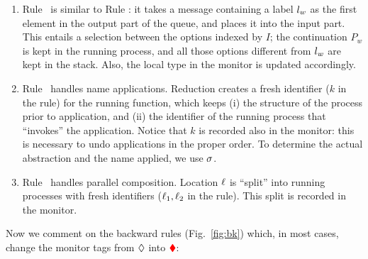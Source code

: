\documentclass[runningheads]{llncs}
\newcommand{\todo}[1]{\textcolor{red}{TO DO:#1}}
\newcommand{\erase}[1]{#1}
\begin{document}
\begin{enumerate}[$\fwcolor{\blacktriangleright}$]
\item 
\erase{Rule~ is similar to Rule \fwcolor{\textsc{(Sel)}}: it takes a message containing a label $l_w$ as the first element in the output part of the queue, and places it into the input part. This entails a selection between the options indexed by $I$; the continuation $P_w$ is kept in the running process, and all those options different from $l_w$ are kept in the stack. Also, the local type in the monitor is updated accordingly.
}
\item Rule~ handles name applications. Reduction  creates a fresh identifier ($k$ in the rule) for the running function, which keeps (i) the structure of the process prior to application, and (ii) the identifier of the running process that ``invokes'' the application. Notice that $k$ is recorded also in the monitor: this is necessary to undo applications in the proper order. To determine the actual abstraction and the name applied, we use   $\sigma$.

\item Rule~ handles parallel composition. Location $\ell$ is ``split'' into running processes with fresh identifiers ($\ell_1, \ell_2$ in the rule). This split is recorded in the   monitor.
\end{enumerate}



\noindent
Now we comment on the backward rules (Fig.~\ref{fig:bk}) which, in most cases, change the monitor tags from $\lozenge$ into $\textcolor{red}{\blacklozenge}$:
\end{document}
